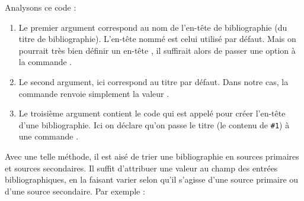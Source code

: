 Analysons ce code :
\begin{enumerate}
\item Le premier argument correspond au nom de l'en-tête de bibliographie (du titre de bibliographie). L'en-tête nommé  est celui utilisé par défaut. Mais on pourrait très bien définir un en-tête , il suffirait alors de passer une option  à la commande .


\item Le second argument, ici  correspond au titre par défaut. Dans notre cas, la commande  renvoie simplement la valeur .
\item Le troisième argument contient le code qui est appelé pour créer l'en-tête d'une bibliographie. Ici on déclare qu'on passe le titre (le contenu de \verb|#1|) à une commande .
\end{enumerate}


Avec une telle méthode, il est aisé de trier une bibliographie en sources primaires et sources secondaires. Il suffit d'attribuer une valeur au champ  des entrées bibliographiques, en la faisant varier selon qu'il s'agisse d'une source primaire ou d'une source secondaire.
Par exemple :



